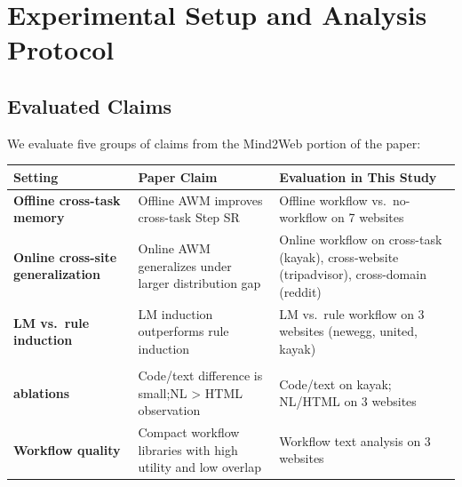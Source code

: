 \documentclass{article}
\begin{document}
\section{Experimental Setup and Analysis Protocol}\label{reproduction-methodology}

\subsection{Evaluated Claims}\label{claim-structure}

We evaluate five groups of claims from the Mind2Web portion of the
paper:

{\begin{longtable}[]{@{}
  >{\raggedright\arraybackslash}p{}
  >{\raggedright\arraybackslash}p{}
  >{\raggedright\arraybackslash}p{}@{}}
\toprule\noalign{}
\begin{minipage}[b]{\linewidth}\raggedright
Setting
\end{minipage} & \begin{minipage}[b]{\linewidth}\raggedright
Paper Claim
\end{minipage} & \begin{minipage}[b]{\linewidth}\raggedright
Evaluation in This Study
\end{minipage} \\
\midrule\noalign{}
\endhead
\bottomrule\noalign{}
\endlastfoot
\textbf{Offline cross-task memory} & Offline AWM improves cross-task Step SR & Offline workflow
vs.~no-workflow on 7 websites \\
\textbf{Online cross-site generalization} & Online AWM generalizes under larger distribution gap &
Online workflow on cross-task (kayak), cross-website (tripadvisor),
cross-domain (reddit) \\
\textbf{LM vs.~rule induction} & LM induction outperforms rule induction & LM vs.~rule
workflow on 3 websites (newegg, united, kayak) \\
\shortstack[l]{\textbf{Representation}\\\textbf{ablations}} & Code/text difference is small;\newline NL \textgreater{} HTML observation & Code/text on kayak; NL/HTML on 3 websites \\
\textbf{Workflow quality} & Compact workflow libraries with high utility and low
overlap & Workflow text analysis on 3 websites \\
\end{longtable}
}
\end{document}
